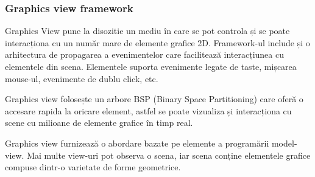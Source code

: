 \subsubsection{Graphics view framework}

Graphics View pune la disozitie un mediu în care se pot controla și se poate interacționa cu un număr mare de elemente grafice 2D. 
Framework-ul include și o arhitectura de propagarea a evenimentelor care facilitează interacțiunea cu elementele din scena. 
Elementele suporta evenimente legate de taste, mișcarea mouse-ul, evenimente de dublu click, etc. \newline

Graphics view folosește un arbore BSP (Binary Space Partitioning) care oferă o accesare rapida la oricare element, astfel se poate 
vizualiza și interacționa cu scene cu milioane de elemente grafice în timp real.\newline

Graphics view furnizează o abordare bazate pe elemente a programării model-view. Mai multe view-uri pot observa o scena, 
iar scena conține elementele grafice compuse dintr-o varietate de forme geometrice.\newline

